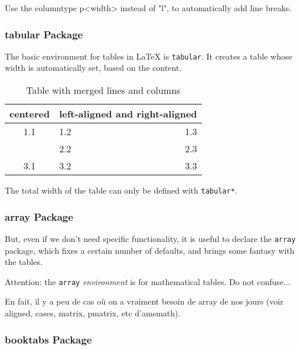 \documentclass{mcreport}
\begin{document}
Use the columntype p{<width>} instead of "l", to automatically add line
breaks.

\subsubsection{tabular Package}
\label{sec:tabular-package}

The basic environment for tables in \LaTeX{} is \texttt{tabular}. It creates
a table whose width is automatically set, based on the content.

\begin{table}[!ht]
    \centering
    \begin{tabular}{| c | p{2cm} | r |}
        \hline
        centered     & \multicolumn{2}{c|}{left-aligned and right-aligned} \\
        \hline
        1.1          & 1.2                & 1.3                            \\
        \cline{2-3}  & 2.2                & 2.3                            \\
        \hline
        3.1          & 3.2                & 3.3                            \\
        \hline
    \end{tabular}
    \caption{Table with merged lines and columns}
    \label{tab:table}
\end{table}

The total width of the table can only be defined with \verb|tabular*|.

\subsubsection{array Package}
\label{sec:array-package}

But, even if we don't need specific functionality, it is useful to declare
the \texttt{array} package, which fixes a certain number of defaults, and
brings some fantasy with the tables.

\begin{mcnote}
    Attention: the \texttt{array} \emph{environment} is for mathematical
    tables. Do not confuse...

    En fait, il y a peu de cas où on a vraiment besoin de array de nos jours
    (voir aligned, cases, matrix, pmatrix, etc d'amsmath).
\end{mcnote}

\subsubsection{booktabs Package}
\label{sec:booktabs-package}
\end{document}
